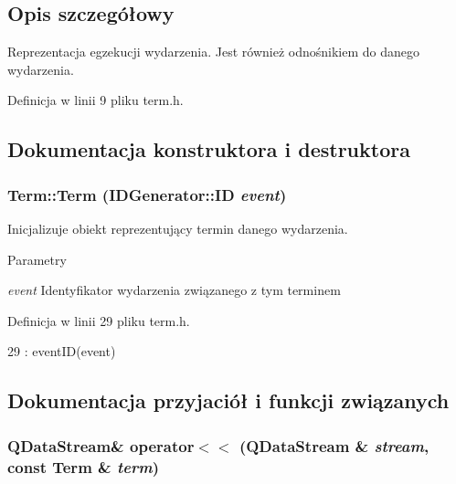 \subsection{Opis szczegółowy}
Reprezentacja egzekucji wydarzenia. Jest również odnośnikiem do danego wydarzenia. 

Definicja w linii 9 pliku term.h.



\subsection{Dokumentacja konstruktora i destruktora}
\hypertarget{classTerm_a8621decf6499e1b597de930add62240a}{
\subsubsection[{Term}]{\setlength{\rightskip}{0pt plus 5cm}Term::Term ({\bf IDGenerator::ID} {\em event})}}
\label{classTerm_a8621decf6499e1b597de930add62240a}


Inicjalizuje obiekt reprezentujący termin danego wydarzenia. 


\begin{DoxyParams}{Parametry}
\item[{\em event}]Identyfikator wydarzenia związanego z tym terminem \end{DoxyParams}


Definicja w linii 29 pliku term.h.




\begin{DoxyCode}
29 : eventID(event) {}
\end{DoxyCode}




\subsection{Dokumentacja przyjaciół i funkcji związanych}
\hypertarget{classTerm_a607138da9b016f91528f99ab09407712}{
\subsubsection[{operator$<$$<$}]{\setlength{\rightskip}{0pt plus 5cm}QDataStream\& operator$<$$<$ (QDataStream \& {\em stream}, \/  const {\bf Term} \& {\em term})}}
\label{classTerm_a607138da9b016f91528f99ab09407712}


